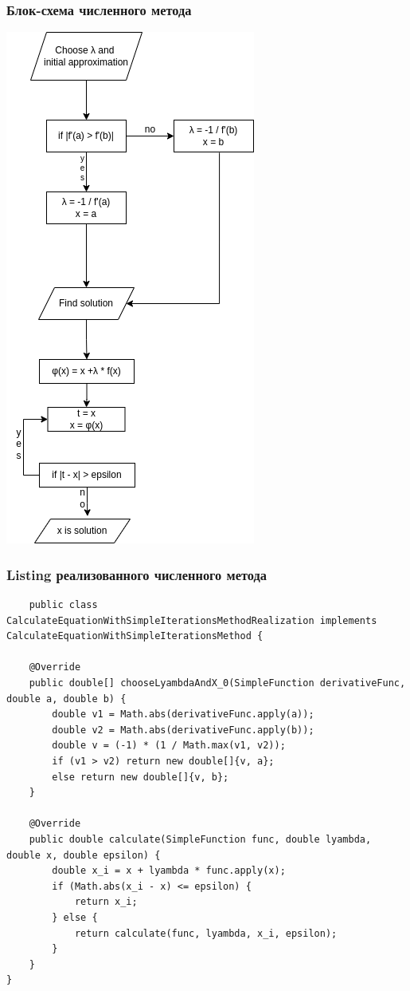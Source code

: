 \subsubsection{Блок-схема численного метода}
\includegraphics[scale=0.4]{img/block_2_iter}

\subsubsection{Listing реализованного численного метода}
\tiny
\begin{verbatim}
    public class CalculateEquationWithSimpleIterationsMethodRealization implements CalculateEquationWithSimpleIterationsMethod {

    @Override
    public double[] chooseLyambdaAndX_0(SimpleFunction derivativeFunc, double a, double b) {
        double v1 = Math.abs(derivativeFunc.apply(a));
        double v2 = Math.abs(derivativeFunc.apply(b));
        double v = (-1) * (1 / Math.max(v1, v2));
        if (v1 > v2) return new double[]{v, a};
        else return new double[]{v, b};
    }

    @Override
    public double calculate(SimpleFunction func, double lyambda, double x, double epsilon) {
        double x_i = x + lyambda * func.apply(x);
        if (Math.abs(x_i - x) <= epsilon) {
            return x_i;
        } else {
            return calculate(func, lyambda, x_i, epsilon);
        }
    }
}
\end{verbatim}
\normalsize


